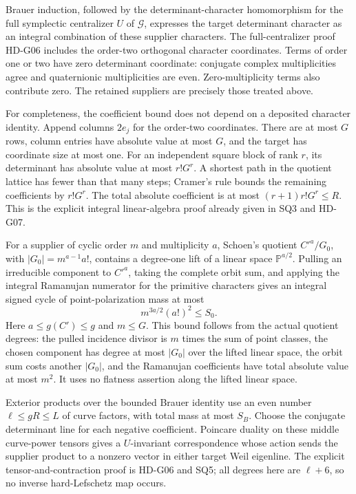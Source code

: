 Brauer induction, followed by the determinant-character
homomorphism for the full symplectic centralizer \(U\) of
\(\mathcal G\), expresses the target determinant character as
an integral combination of these supplier characters.
The full-centralizer proof HD-G06 includes the order-two
orthogonal character coordinates. Terms of order one or two
have zero determinant coordinate: conjugate complex
multiplicities agree and quaternionic multiplicities are even.
Zero-multiplicity terms also contribute zero. The retained
suppliers are precisely those treated above.

For completeness, the coefficient bound does not depend on a
deposited character identity. Append columns \(2e_j\) for the
order-two coordinates. There are at most \(G\) rows, column
entries have absolute value at most \(G\), and the target has
coordinate size at most one. For an independent square block
of rank \(r\), its determinant has absolute value at most
\(r!G^r\). A shortest path in the quotient lattice has fewer
than that many steps; Cramer's rule bounds the remaining
coefficients by \(r!G^r\). The total absolute coefficient is at
most \((r+1)r!G^r\le R\). This is the explicit integral
linear-algebra proof already given in SQ3 and HD-G07.

For a supplier of cyclic order \(m\) and multiplicity \(a\),
Schoen's quotient \(C'^a/G_0\), with
\(|G_0|=m^{a-1}a!\), contains a degree-one lift of a linear
space \(\mathbb P^{a/2}\). Pulling an irreducible component
to \(C'^a\), taking the complete orbit sum, and applying the
integral Ramanujan numerator for the primitive characters
gives an integral signed cycle of point-polarization mass
at most
\[
 m^{3a/2}(a!)^2\le S_0.                                  \tag{S14.4}
\]
Here \(a\le g(C')\le g\) and \(m\le G\).
This bound follows from the actual quotient degrees:
the pulled incidence divisor is \(m\) times the sum of point
classes, the chosen component has degree at most \(|G_0|\)
over the lifted linear space, the orbit sum costs another
\(|G_0|\), and the Ramanujan coefficients have total absolute
value at most \(m^2\). It uses no flatness assertion along
the lifted linear space.

Exterior products over the bounded Brauer identity use an even
number \(\ell\le gR\le L\) of curve factors, with total mass
at most \(S_B\). Choose the conjugate determinant line for each
negative coefficient. Poincare duality on these middle curve-power
tensors gives a \(U\)-invariant correspondence whose action sends
the supplier product to a nonzero vector in either target Weil
eigenline. The explicit tensor-and-contraction proof is HD-G06
and SQ5; all degrees here are \(\ell+6\), so no inverse
hard-Lefschetz map occurs.

